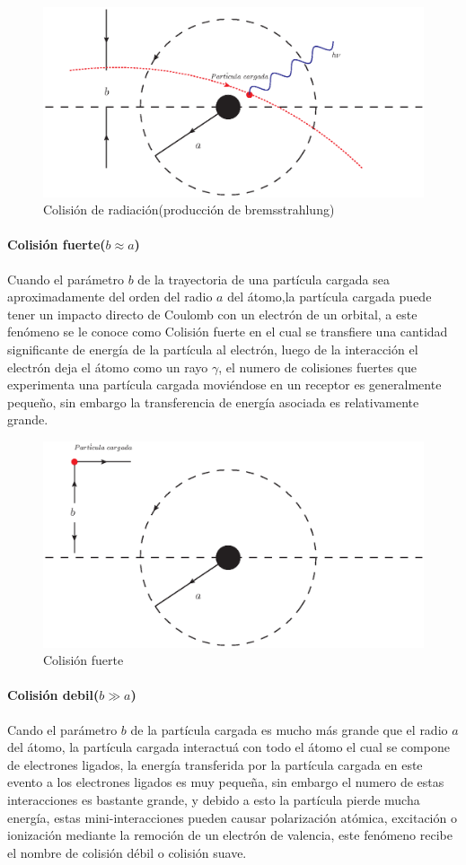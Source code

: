 \begin{figure}[htbp]
   \centering
   \includegraphics[width=.65\linewidth]{./Figures/radiacol.eps}
   \caption[Colisión de radiación]{Colisión de radiación(producción de bremsstrahlung)}
   \label{fig:B}
\end{figure}


\paragraph{Colisión fuerte($b\approx a$)}
Cuando el parámetro $b$ de la trayectoria de una partícula cargada sea aproximadamente del orden del radio $a$ del átomo,la partícula cargada puede tener un impacto directo de Coulomb con un electrón de un orbital, a este fenómeno se le conoce como Colisión fuerte en el cual se transfiere una cantidad significante de energía de la partícula al electrón, luego de la interacción el electrón deja el átomo como un rayo $\gamma$, el numero de colisiones fuertes que  experimenta  una partícula cargada moviéndose en un receptor es generalmente pequeño, sin embargo la transferencia de energía asociada es relativamente grande\cite{Podgorsak}.


\begin{figure}[htbp]
   \centering
   \includegraphics[width=.65\linewidth]{./Figures/hardcoli.eps}
   \caption{Colisión fuerte}
   \label{fig:cf}
\end{figure}

\paragraph{Colisión debil($b\gg a$)}
Cando el parámetro $b$ de la partícula cargada es mucho más grande que el radio $a$ del átomo, la partícula cargada interactuá con todo el átomo el cual se compone de electrones ligados, la energía transferida por la partícula cargada en este evento a los electrones ligados es muy pequeña, sin embargo el numero de estas interacciones es bastante grande, y debido a esto la partícula pierde mucha energía, estas mini-interacciones pueden causar polarización atómica, excitación o ionización mediante la remoción de un electrón de valencia, este fenómeno recibe el nombre de colisión débil o colisión suave\cite{Podgorsak}.

